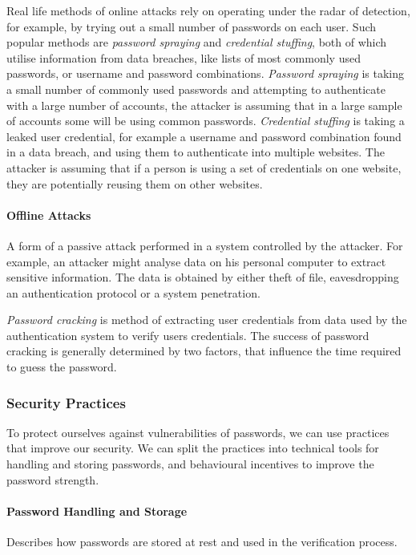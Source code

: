 Real life methods of online attacks rely on operating under the radar of detection, for example, by trying out a small number of passwords on each user.
Such popular methods are \textit{password spraying} and \textit{credential stuffing}, both of which utilise information from data breaches, like lists of most commonly used passwords, or username and password combinations.
\textit{Password spraying} is taking a small number of commonly used passwords and attempting to authenticate with a large number of accounts, the attacker is assuming that in a large sample of accounts some will be using common passwords.
\textit{Credential stuffing} is taking a leaked user credential, for example a username and password combination found in a data breach, and using them to authenticate into multiple websites. 
The attacker is assuming that if a person is using a set of credentials on one website, they are potentially reusing them on other websites.

\paragraph{Offline Attacks} 
A form of a passive attack performed in a system controlled by the attacker.
For example, an attacker might analyse data on his personal computer to extract sensitive information. The data is obtained by either theft of file, eavesdropping an authentication protocol or a system penetration.

\textit{Password cracking} is method of extracting user credentials from data used by the authentication system to verify users credentials.
The success of password cracking is generally determined by two factors, that influence the time required to guess the password.

\subsubsection{Security Practices}
To protect ourselves against vulnerabilities of passwords, we can use practices that improve our security.
We can split the practices into technical tools for handling and storing passwords, and behavioural incentives to improve the password strength.

\paragraph{Password Handling and Storage}
Describes how passwords are stored at rest and used in the verification process.

